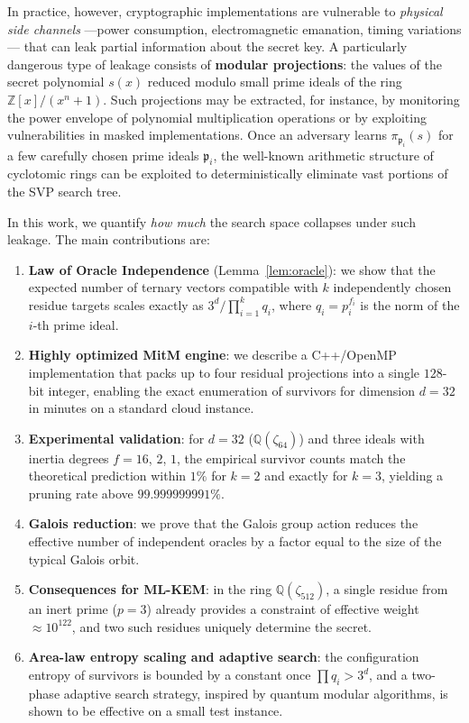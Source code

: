 \documentclass[12pt,a4paper]{article}
\begin{document}
In practice, however, cryptographic implementations are vulnerable to \emph{physical side channels} —power consumption, electromagnetic emanation, timing variations— that can leak partial information about the secret key. A particularly dangerous type of leakage consists of \textbf{modular projections}: the values of the secret polynomial $s(x)$ reduced modulo small prime ideals of the ring $\mathbb{Z}[x]/(x^n+1)$. Such projections may be extracted, for instance, by monitoring the power envelope of polynomial multiplication operations or by exploiting vulnerabilities in masked implementations. Once an adversary learns $\pi_{\mathfrak{p}_i}(s)$ for a few carefully chosen prime ideals $\mathfrak{p}_i$, the well-known arithmetic structure of cyclotomic rings can be exploited to deterministically eliminate vast portions of the SVP search tree.

In this work, we quantify \emph{how much} the search space collapses under such leakage. The main contributions are:

\begin{enumerate}
    \item \textbf{Law of Oracle Independence} (Lemma~\ref{lem:oracle}): we show that the expected number of ternary vectors compatible with $k$ independently chosen residue targets scales exactly as $3^d / \prod_{i=1}^k q_i$, where $q_i = p_i^{f_i}$ is the norm of the $i$-th prime ideal.
    
    \item \textbf{Highly optimized MitM engine}: we describe a C++/OpenMP implementation that packs up to four residual projections into a single $128$-bit integer, enabling the exact enumeration of survivors for dimension $d=32$ in minutes on a standard cloud instance.
    
    \item \textbf{Experimental validation}: for $d=32$ ($\mathbb{Q}(\zeta_{64})$) and three ideals with inertia degrees $f=16$, $2$, $1$, the empirical survivor counts match the theoretical prediction within $1\%$ for $k=2$ and exactly for $k=3$, yielding a pruning rate above $99.999999991\%$.
    
    \item \textbf{Galois reduction}: we prove that the Galois group action reduces the effective number of independent oracles by a factor equal to the size of the typical Galois orbit.
    
    \item \textbf{Consequences for ML-KEM}: in the ring $\mathbb{Q}(\zeta_{512})$, a single residue from an inert prime ($p=3$) already provides a constraint of effective weight $\approx 10^{122}$, and two such residues uniquely determine the secret.
    
    \item \textbf{Area-law entropy scaling and adaptive search}: the configuration entropy of survivors is bounded by a constant once $\prod q_i > 3^d$, and a two-phase adaptive search strategy, inspired by quantum modular algorithms, is shown to be effective on a small test instance.
\end{enumerate}
\end{document}
